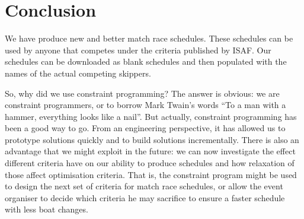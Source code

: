 \documentclass{llncs}
\begin{document}
\section{Conclusion}\label{sec:conclusions}

We have produce new and better match race schedules. These schedules can be used by anyone that
competes under the criteria published by ISAF. Our schedules can be downloaded as blank schedules
and then populated with the names of the actual competing skippers.

So, why did we use constraint programming? The answer is obvious:  we are constraint programmers, or
to borrow Mark Twain's words ``To a man with a hammer, everything looks like a nail''. But actually,
constraint programming has been a good way to go. From an engineering perspective, it has allowed us
to prototype solutions quickly and to build solutions incrementally. There is also an advantage that
we might exploit in the future: we can now investigate the effect different criteria have on our
ability to produce schedules and how relaxation of those affect optimisation criteria. That is, the
constraint program might be used to design the next set of criteria for match race schedules, or
allow the event organiser to decide which criteria he may sacrifice to ensure a faster schedule with
less boat changes.



\end{document}
